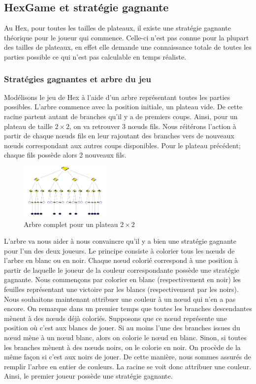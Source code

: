 \subsection{HexGame et stratégie gagnante}

Au Hex, pour toutes les tailles de plateaux, il existe une stratégie gagnante théorique pour le joueur qui commence.
Celle-ci n'est pas connue pour la plupart des tailles de plateaux, en effet elle demande une connaissance totale de toutes  
les parties possible ce qui n'est pas calculable en temps réaliste.

\subsubsection{Stratégies gagnantes et arbre du jeu}
Modélisons le jeu de Hex à l'aide d'un arbre représentant toutes les parties possibles. L'arbre commence avec la position 
initiale, un plateau vide. De cette racine partent autant de branches qu'il y a de premiers coups. Ainsi, pour un plateau de
taille $2\times2$, on va retrouver 3 nœuds fils. Nous réitérons l'action à partir de chaque nœuds fils en leur rajoutant des branches vers
de nouveaux nœuds correspondant aux autres coups disponibles. Pour le plateau précédent; chaque fils possède alors 2 nouveaux fils.
\begin{figure}[h]
    \begin{center}
        \includegraphics[width=0.4\textwidth]{root/strategie_gagnante.png}
    \end{center}
    \caption{Arbre complet pour un plateau $2\times2$}\label{fig:strategie_gagnante}
\end{figure}


L'arbre va nous aider à nous convaincre qu'il y a bien une stratégie gagnante pour l'un des deux joueurs. 
Le principe consiste à colorier tous les nœuds de l'arbre en blanc ou en noir. Chaque
nœud colorié correspond à une position à partir de laquelle le joueur de la couleur correspondante
possède une stratégie gagnante. 
Nous commençons par colorier en blanc (respectivement en noir) les feuilles représentant une victoire par les blancs
(respectivement par les noirs).
Nous souhaitons maintenant attribuer une couleur à un nœud qui n'en a pas encore. On remarque dans un premier temps que toutes les 
branches descendantes mènent à des nœuds déjà coloriés. Supposons que ce nœud représente une position où c'est 
aux blancs de jouer. Si au moins l'une des branches issues du nœud mène à un nœud blanc, alors on colorie le nœud
en blanc. Sinon, si toutes les branches mènent à des nœuds noirs, on le colorie en noir. On procède de la même façon si c'est 
aux noirs de jouer. De cette manière, nous sommes assurés de remplir l'arbre en entier de couleurs. La racine se voit donc attribuer 
une couleur. Ainsi, le premier joueur possède une stratégie gagnante.



